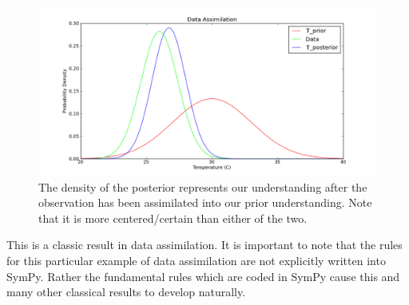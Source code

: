 \begin{figure}[ht]
\vspace{-0pt}
\centering
\includegraphics[width=.7\textwidth]{images/posterior.png}
\vspace{-0pt}
\caption{The density of the posterior represents our understanding after the observation has been assimilated into our prior understanding. Note that it is more centered/certain than either of the two. }
\label{fig:DA_posterior}
\vspace{00pt}
\end{figure}

This is a classic result in data assimilation. It is important to note that
the rules for this particular example of data assimilation are not explicitly written into SymPy. Rather the fundamental rules which are coded in SymPy cause this and many other classical results to develop naturally. 
